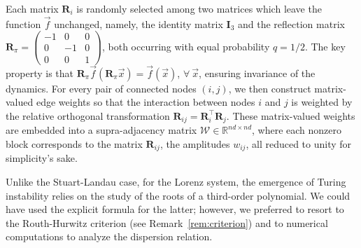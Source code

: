 \documentclass[aps,showpacs,preprintnumbers,amsmath,amssymb,twocolumn,superscriptaddress,floatfix,nofootinbib,10pt,pre]{revtex4-1}
\begin{document}
Each matrix $\mathbf{R}_i$ is randomly selected among two matrices which leave the function $\vec{f}$ unchanged, namely, the identity matrix $\mathbf{I}_3$ and the reflection matrix $\mathbf{R}_{\pi} =\left(\begin{smallmatrix}
    -1 & 0 &0\\0 & -1 & 0\\ 0 & 0 & 1
\end{smallmatrix}\right)$, both occurring with equal probability $q=1/2$. The key property is that $\mathbf R_\pi\vec f(\mathbf R_\pi\vec x)=\vec f(\vec x)$, $\forall\:\vec x$, ensuring invariance of the dynamics. For every pair of connected nodes $(i,j)$, we then construct matrix-valued edge weights so that the interaction between nodes $i$ and $j$ is weighted by the relative orthogonal transformation $\mathbf{R}_{ij} = \mathbf{R}_i^\top \mathbf{R}_j$.
These matrix-valued weights are embedded into a supra-adjacency matrix $\mathcal{W} \in \mathbb{R}^{nd \times nd}$, where each nonzero block corresponds to the matrix $\mathbf{R}_{ij}$, the amplitudes $w_{ij}$, all reduced to unity for simplicity's sake. 


Unlike the Stuart-Landau case, for the Lorenz system, the emergence of Turing instability relies on the study of the roots of a third-order polynomial. We could have used the explicit formula for the latter; however, we preferred to resort to the Routh-Hurwitz criterion (see Remark~\ref{rem:criterion}) and to numerical computations to analyze the dispersion relation.
\end{document}
